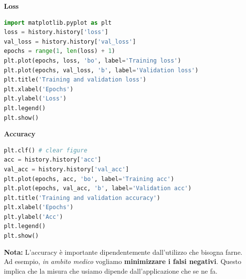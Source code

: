 \textbf{Loss}

\begin{lstlisting}[language=Python]
import matplotlib.pyplot as plt
loss = history.history['loss']
val_loss = history.history['val_loss']
epochs = range(1, len(loss) + 1)
plt.plot(epochs, loss, 'bo', label='Training loss')
plt.plot(epochs, val_loss, 'b', label='Validation loss')
plt.title('Training and validation loss')
plt.xlabel('Epochs')
plt.ylabel('Loss')
plt.legend()
plt.show()
\end{lstlisting}

\textbf{Accuracy}

\begin{lstlisting}[language=Python]
plt.clf() # clear figure
acc = history.history['acc']
val_acc = history.history['val_acc']
plt.plot(epochs, acc, 'bo', label='Training acc')
plt.plot(epochs, val_acc, 'b', label='Validation acc')
plt.title('Training and validation accuracy')
plt.xlabel('Epochs')
plt.ylabel('Acc')
plt.legend()
plt.show()

\end{lstlisting}

\textbf{Nota:} L'accuracy è importante dipendentemente dall'utilizzo che bisogna farne.
Ad esempio, \textit{in ambito medico} vogliamo \textbf{minimizzare i falsi negativi}. Questo implica
che la misura che usiamo dipende dall'applicazione che se ne fa.